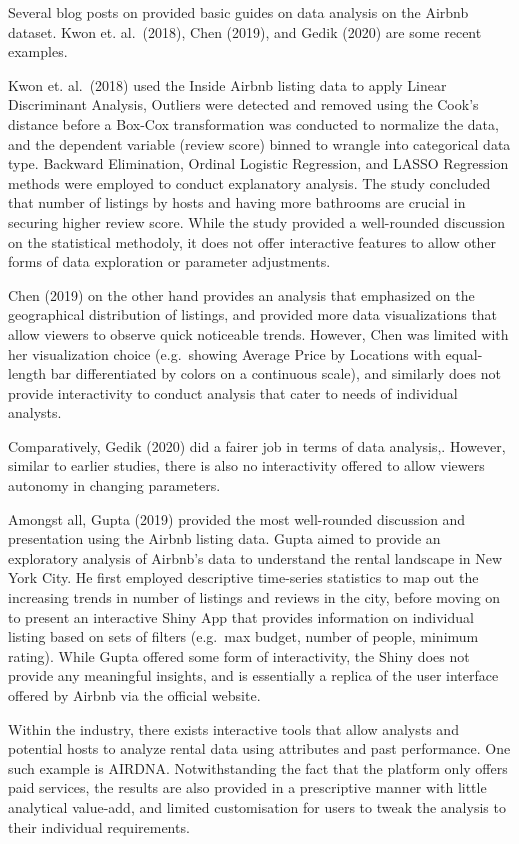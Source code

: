 \documentclass{acm_proc_article-sp}
\begin{document}
Several blog posts on provided basic guides on data analysis on the
Airbnb dataset. Kwon et. al.~(2018), Chen (2019), and Gedik (2020) are
some recent examples.

Kwon et. al.~(2018) used the Inside Airbnb listing data to apply Linear
Discriminant Analysis, Outliers were detected and removed using the
Cook's distance before a Box-Cox transformation was conducted to
normalize the data, and the dependent variable (review score) binned to
wrangle into categorical data type. Backward Elimination, Ordinal
Logistic Regression, and LASSO Regression methods were employed to
conduct explanatory analysis. The study concluded that number of
listings by hosts and having more bathrooms are crucial in securing
higher review score. While the study provided a well-rounded discussion
on the statistical methodoly, it does not offer interactive features to
allow other forms of data exploration or parameter adjustments.

Chen (2019) on the other hand provides an analysis that emphasized on
the geographical distribution of listings, and provided more data
visualizations that allow viewers to observe quick noticeable trends.
However, Chen was limited with her visualization choice (e.g.~showing
Average Price by Locations with equal-length bar differentiated by
colors on a continuous scale), and similarly does not provide
interactivity to conduct analysis that cater to needs of individual
analysts.

Comparatively, Gedik (2020) did a fairer job in terms of data analysis,.
However, similar to earlier studies, there is also no interactivity
offered to allow viewers autonomy in changing parameters.

Amongst all, Gupta (2019) provided the most well-rounded discussion and
presentation using the Airbnb listing data. Gupta aimed to provide an
exploratory analysis of Airbnb's data to understand the rental landscape
in New York City. He first employed descriptive time-series statistics
to map out the increasing trends in number of listings and reviews in
the city, before moving on to present an interactive Shiny App that
provides information on individual listing based on sets of filters
(e.g.~max budget, number of people, minimum rating). While Gupta offered
some form of interactivity, the Shiny does not provide any meaningful
insights, and is essentially a replica of the user interface offered by
Airbnb via the official website.

Within the industry, there exists interactive tools that allow analysts
and potential hosts to analyze rental data using attributes and past
performance. One such example is AIRDNA. Notwithstanding the fact that
the platform only offers paid services, the results are also provided in
a prescriptive manner with little analytical value-add, and limited
customisation for users to tweak the analysis to their individual
requirements.
\end{document}
